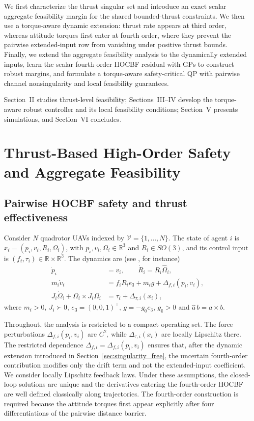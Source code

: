 \documentclass[journal,twoside,web]{ieeecolor}
\begin{document}
We first characterize the thrust singular set and introduce
an exact scalar aggregate feasibility margin for the shared
bounded-thrust constraints. We then use a torque-aware dynamic extension: thrust rate appears at third
order, whereas attitude torques first enter at fourth order, where they
prevent the pairwise extended-input row from vanishing under positive
thrust bounds. Finally, we extend the aggregate feasibility analysis to the dynamically extended inputs, learn the scalar fourth-order HOCBF residual with GPs to construct robust margins, and formulate a torque-aware safety-critical QP with
pairwise channel nonsingularity and local feasibility guarantees.

Section~II studies thrust-level feasibility; Sections~III--IV
develop the torque-aware robust controller and its local feasibility
conditions; Section~V presents simulations, and Section~VI concludes.

\section{Thrust-Based High-Order Safety and Aggregate Feasibility}\label{secII}

\subsection{Pairwise HOCBF safety and thrust effectiveness}

Consider $N$ quadrotor UAVs indexed by
$\mathcal V=\{1,\ldots,N\}$. The state of agent $i$ is
$x_i=(p_i,v_i,R_i,\Omega_i)$, with $p_i,v_i,\Omega_i\in
\mathbb R^3$ and $R_i\in SO(3)$, and its control input is
$(f_i,\tau_i)\in\mathbb R\times\mathbb R^3$. The dynamics are (see \cite{lee2010geometric}, for instance)
\begin{align}
    \dot p_i &=v_i,\qquad
    \dot R_i=R_i\widehat{\Omega}_i,                         \label{eq:quad_kin}\\
    m_i\dot v_i
    &=f_iR_ie_3+m_i g+\Delta_{f,i}(p_i,v_i),                    \label{eq:quad_trans}\\
    J_i\dot\Omega_i+\Omega_i\times J_i\Omega_i
    &=\tau_i+\Delta_{\tau,i}(x_i),                          \label{eq:quad_rot}
\end{align}
where $m_i>0$, $J_i\succ0$, $e_3=(0,0,1)^\top$,
$g=-g_0e_3$, \(g_0>0\) and $\widehat a\,b=a\times b$.

Throughout, the analysis is restricted to a compact operating
set. The force perturbations $\Delta_{f,i}(p_i,v_i)$ are
$C^2$, while $\Delta_{\tau,i}(x_i)$ are locally Lipschitz
there. The restricted dependence
$\Delta_{f,i}=\Delta_{f,i}(p_i,v_i)$ ensures that, after the
dynamic extension introduced in Section~\ref{sec:singularity_free}, the uncertain
fourth-order contribution modifies only the drift term and not
the extended-input coefficient. We consider locally Lipschitz feedback laws. Under
these assumptions, the closed-loop solutions are unique and
the derivatives entering the fourth-order HOCBF are well
defined classically along trajectories. The fourth-order construction is required because the attitude
torques first appear explicitly after four differentiations of
the pairwise distance barrier.
\end{document}
